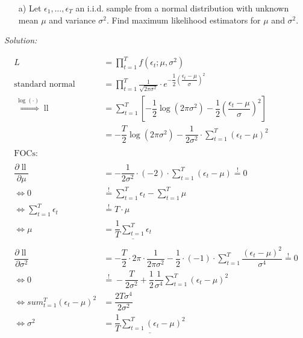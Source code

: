 \documentclass[12pt,a4paper]{article}
\newcommand{\loglik}{\operatorname{ll}}
\begin{document}
\begin{itemize}
    \item[a)] Let $\epsilon_1, \dots , \epsilon_T$ an i.i.d. sample from a normal distribution with unknown mean $\mu$ and variance $\sigma^2$. Find maximum likelihood estimators for $\mu$ and $\sigma^2$.
\end{itemize}

\emph{Solution:}

\begin{align*}
  L & = \prod_{t = 1}^{T} f \left( \epsilon_t ; \mu , \sigma^2 \right)\\
  \text{standard normal} & = \prod_{t = 1}^{T} \frac{1}{\sqrt{2 \pi \sigma^2}} \cdot e^{-\dfrac{1}{2} \left( \dfrac{\epsilon_t - \mu}{\sigma }\right)^2}\\
  \overset{\log(\cdot)}{\Rightarrow} \loglik & =  \sum_{t = 1}^{T} \left[ -\dfrac{1}{2} \log (2 \pi \sigma^2) - \dfrac{1}{2}   \left( \dfrac{\epsilon_t - \mu}{\sigma}\right)^2\right]\\
  & =  -\dfrac{T}{2} \log (2 \pi \sigma^2) - \dfrac{1}{2 \sigma^2} \cdot \sum_{t = 1}^{T} (\epsilon_t - \mu)^2 \\
  \\
  \text{FOCs}: \\
  \\
  \dfrac{\partial \loglik}{\partial \mu} & = - \dfrac{1}{2 \sigma^2} \cdot (-2) \cdot \sum_{t = 1}^{T} (\epsilon_t - \mu) \overset{!}{=} 0 \\
  \Leftrightarrow 0 & \overset{!}{=}  \sum_{t = 1}^{T} \epsilon_t - \sum_{t = 1}^{T} \mu \\
  \Leftrightarrow  \sum_{t = 1}^{T} \epsilon_t & \overset{!}{=} T \cdot \mu   \\
  \Leftrightarrow  \mu & = \underline{ \dfrac{1}{T} \sum_{t = 1}^{T} \epsilon_t} \\
  \\
   \dfrac{\partial \loglik}{\partial \sigma^2} & = - \dfrac{T}{2} \cdot 2  \pi \cdot \dfrac{1}{2 \pi \sigma^2} - \dfrac{1}{2}  \cdot (-1) \cdot \sum_{t = 1}^{T}  \dfrac{(\epsilon_t - \mu)^2}{\sigma^4}  \overset{!}{=} 0 \\
  \Leftrightarrow 0 & \overset{!}{=} - \dfrac{T}{2 \sigma^2} + \dfrac{1}{2}  \dfrac{1}{\sigma^4} \sum_{t = 1}^{T} (\epsilon_t - \mu)^2\\
  \Leftrightarrow sum_{t = 1}^{T} (\epsilon_t - \mu)^2 & = \dfrac{2 T \sigma^4}{ 2 \sigma^2}\\
  \Leftrightarrow \sigma^2 & = \underline{ \dfrac{1}{T} \sum_{t = 1}^{T} (\epsilon_t - \mu)^2}
\end{align*}
\end{document}
